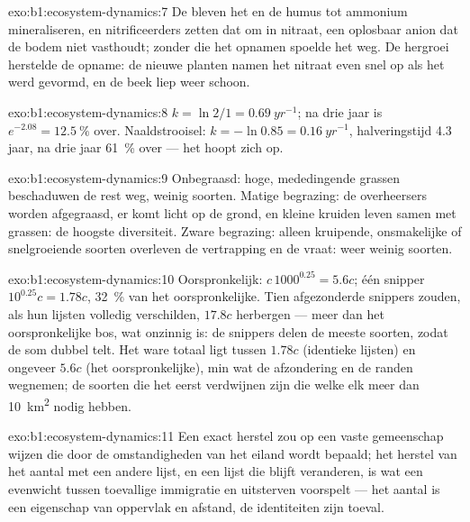 \begin{solution}{exo:b1:ecosystem-dynamics:7}
De  bleven het  en de humus tot ammonium mineraliseren, en
nitrificeerders zetten dat om in nitraat, een oplosbaar anion dat de bodem
niet vasthoudt; zonder  die het opnamen spoelde het weg. De hergroei
herstelde de opname: de nieuwe planten namen het nitraat even snel op als het
werd gevormd, en de beek liep weer schoon.
\end{solution}

\begin{solution}{exo:b1:ecosystem-dynamics:8}
$k = \ln 2/1 = \qty{0.69}{yr^{-1}}$; na drie jaar is $e^{-2.08} =
\qty{12.5}{\%}$ over. Naaldstrooisel: $k = -\ln 0.85 = \qty{0.16}{yr^{-1}}$,
halveringstijd \num{4.3} jaar, na drie jaar \qty{61}{\%} over --- het
 hoopt zich op.
\end{solution}

\begin{solution}{exo:b1:ecosystem-dynamics:9}
Onbegraasd: hoge, mededingende grassen beschaduwen de rest weg, weinig
soorten. Matige begrazing: de overheersers worden afgegraasd, er komt licht
op de grond, en kleine kruiden leven samen met grassen: de hoogste
diversiteit. Zware begrazing: alleen kruipende, onsmakelijke of snelgroeiende
soorten overleven de vertrapping en de vraat: weer weinig soorten.
\end{solution}

\begin{solution}{exo:b1:ecosystem-dynamics:10}
Oorspronkelijk: $c\,1000^{0.25} = 5.6c$; één snipper $10^{0.25}c = 1.78c$,
\qty{32}{\%} van het oorspronkelijke. Tien afgezonderde snippers zouden, als
hun lijsten volledig verschilden, $17.8c$ herbergen --- meer dan het
oorspronkelijke bos, wat onzinnig is: de snippers delen de meeste soorten,
zodat de som dubbel telt. Het ware totaal ligt tussen $1.78c$ (identieke
lijsten) en ongeveer $5.6c$ (het oorspronkelijke), min wat de afzondering en
de randen wegnemen; de soorten die het eerst verdwijnen zijn die welke elk
meer dan \qty{10}{km^2} nodig hebben.
\end{solution}

\begin{solution}{exo:b1:ecosystem-dynamics:11}
Een exact herstel zou op een vaste gemeenschap wijzen die door de
omstandigheden van het eiland wordt bepaald; het herstel van het aantal met
een andere lijst, en een lijst die blijft veranderen, is wat een evenwicht
tussen toevallige immigratie en uitsterven voorspelt --- het aantal is een
eigenschap van oppervlak en afstand, de identiteiten zijn toeval.
\end{solution}

